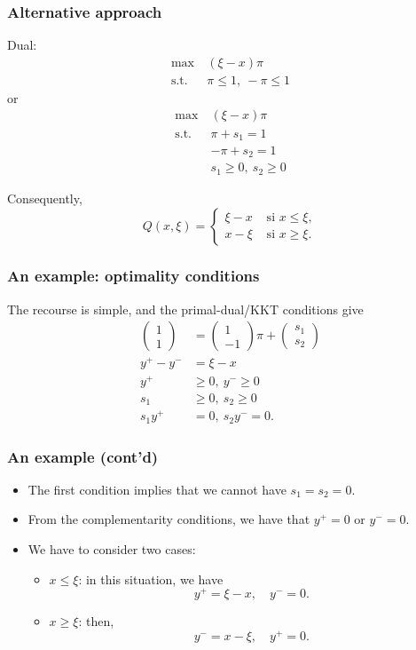 \documentclass{beamer}
\begin{document}
\begin{frame}
\frametitle{Alternative approach}

Dual:
\begin{align*}
\max\ & (\xi-x)\pi \\
\mbox{s.t. } & \pi \leq 1,\ -\pi \leq 1
\end{align*}
or
\begin{align*}
\max\ & (\xi-x)\pi \\
\mbox{s.t. } & \pi + s_1 = 1 \\
& -\pi + s_2 = 1 \\
& s_1 \geq 0,\ s_2 \geq 0
\end{align*}

Consequently,
\[
Q(x,\xi) = \begin{cases} \xi-x & \mbox{ si } x \leq \xi, \\
	x - \xi & \mbox{ si } x \geq \xi. \end{cases}
\]

\end{frame}

\begin{frame}
\frametitle{An example: optimality conditions}

The recourse is simple, and the primal-dual/KKT conditions give
\begin{align*}
\begin{pmatrix} 1 \\ 1 \end{pmatrix} & = \begin{pmatrix} 1 \\
  -1 \end{pmatrix} \pi + \begin{pmatrix} s_1 \\ s_2 \end{pmatrix} \\
y^+ - y^- & = \xi - x \\
y^+ &\geq 0,\  y^- \geq 0 \\
s_1 &\geq 0,\ s_2 \geq 0 \\
s_1y^+ & = 0,\ s_2y^- = 0.
\end{align*}

\end{frame}

\begin{frame}
\frametitle{An example (cont'd)}

\begin{itemize}
\item
The first condition implies that we cannot have
$s_1 = s_2 = 0$.
\item
From the complementarity conditions, we have that $y^+ = 0$ or $y^-
= 0$.
\item
We have to consider two cases:
\begin{itemize}
\item
$x \leq \xi$: in this situation, we have
\[
y^+ = \xi -x,\quad y^- = 0.
\]
\item
$x \geq \xi$: then,
\[
y^- = x-\xi,\quad y^+ = 0.
\]
\end{itemize}
\end{itemize}

\end{frame}
\end{document}
